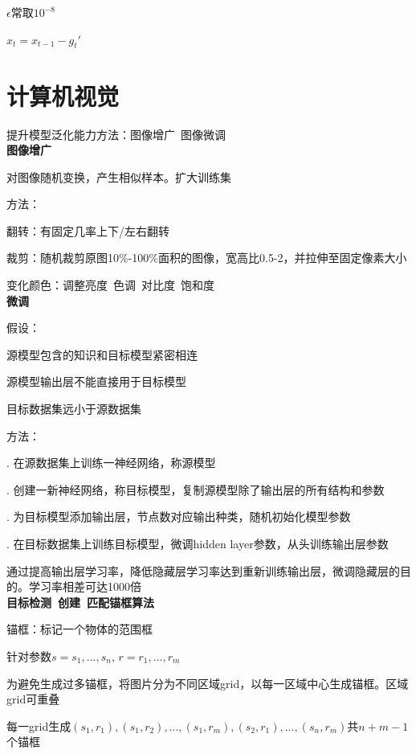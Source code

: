 \documentclass[UTF8]{ctexart}
\begin{document}
  \quad \quad $\epsilon $常取$10^{-8}$

  \quad $x_t = x_{t-1} - g_t'$


\section{计算机视觉}
\noindent 提升模型泛化能力方法：图像增广\ 图像微调\\
\textbf{图像增广}

  对图像随机变换，产生相似样本。扩大训练集

  方法：

  \quad 翻转：有固定几率上下/左右翻转

  \quad 裁剪：随机裁剪原图10\%-100\%面积的图像，宽高比0.5-2，并拉伸至固定像素大小

  \quad 变化颜色：调整亮度\ 色调\ 对比度\ 饱和度\\
\textbf{微调}

  假设：

  \quad 源模型包含的知识和目标模型紧密相连
  
  \quad 源模型输出层不能直接用于目标模型

  \quad 目标数据集远小于源数据集

  方法：
 
  . 在源数据集上训练一神经网络，称源模型

  . 创建一新神经网络，称目标模型，复制源模型除了输出层的所有结构和参数

  . 为目标模型添加输出层，节点数对应输出种类，随机初始化模型参数

  . 在目标数据集上训练目标模型，微调hidden layer参数，从头训练输出层参数

  \quad \quad 通过提高输出层学习率，降低隐藏层学习率达到重新训练输出层，微调隐藏层的目的。学习率相差可达1000倍\\
\textbf{目标检测\ 创建\ 匹配锚框算法}

  锚框：标记一个物体的范围框

  \quad 针对参数$s = {s_1, ..., s_n}$, $r = {r_1, ..., r_m}$

  \quad 为避免生成过多锚框，将图片分为不同区域grid，以每一区域中心生成锚框。区域grid可重叠

  \quad 每一grid生成$(s_1, r_1), (s_1, r_2), ..., (s_1, r_m), (s_2, r_1), ..., (s_n, r_m)$共$n+m-1$个锚框
\end{document}
